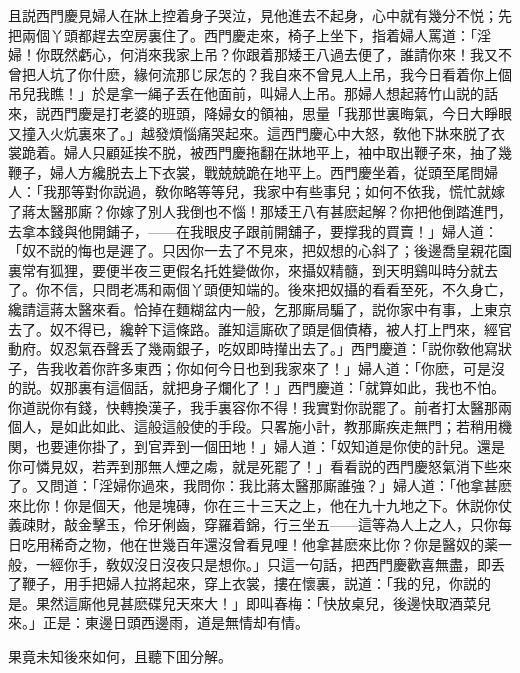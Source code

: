 且説西門慶見婦人在牀上控着身子哭泣，見他進去不起身，心中就有幾分不悦；先把兩個丫頭都趕去空房裏住了。西門慶走來，椅子上坐下，指着婦人罵道：「淫婦！你既然虧心，何消來我家上吊？你跟着那矮王八過去便了，誰請你來！我又不曾把人坑了你什麽，緣何流那じ尿怎的？我自來不曾見人上吊，我今日看着你上個吊兒我瞧！」於是拿一䋲子丢在他面前，叫婦人上吊。那婦人想起蔣竹山説的話來，説西門慶是打老婆的班頭，降婦女的領袖，思量「我那世裏晦氣，今日大睜眼又撞入火炕裏來了。」越發煩惱痛哭起來。這西門慶心中大怒，敎他下牀來脱了衣裳跪着。婦人只顧延挨不脱，被西門慶拖翻在牀地平上，袖中取出鞭子來，抽了幾鞭子，婦人方纔脱去上下衣裳，戰兢兢跪在地平上。西門慶坐着，従頭至尾問婦人：「我那等對你説過，敎你略等等兒，我家中有些事兒；如何不依我，慌忙就嫁了蔣太醫那廝？你嫁了別人我倒也不惱！那矮王八有甚麽起解？你把他倒踏進門，去拿本錢與他開鋪子，——在我眼皮子跟前開舖子，要撑我的買賣！」婦人道：「奴不説的悔也是遲了。只因你一去了不見來，把奴想的心斜了；後邊喬皇親花園裏常有狐狸，要便半夜三更假名托姓變做你，來攝奴精髓，到天明鷄叫時分就去了。你不信，只問老馮和兩個丫頭便知端的。後來把奴攝的看看至死，不久身亡，纔請這蔣太醫來看。恰掉在麵糊盆内一般，乞那廝局騙了，説你家中有事，上東京去了。奴不得已，纔幹下這條路。誰知這廝砍了頭是個債樁，被人打上門來，經官動府。奴忍氣吞聲丢了幾兩銀子，吃奴即時攆出去了。」西門慶道：「説你敎他寫狀子，告我收着你許多東西；你如何今日也到我家來了！」婦人道：「你麽，可是沒的説。奴那裏有這個話，就把身子爛化了！」西門慶道：「就算如此，我也不怕。你道説你有錢，快轉換漢子，我手裏容你不得！我實對你説罷了。前者打太醫那兩個人，是如此如此、這般這般使的手段。只畧施小計，教那廝疾走無門；若稍用機関，也要連你掛了，到官弄到一個田地！」婦人道：「奴知道是你使的計兒。還是你可憐見奴，若弄到那無人煙之䖏，就是死罷了！」看看説的西門慶怒氣消下些來了。又問道：「淫婦你過來，我問你：我比蔣太醫那廝誰強？」婦人道：「他拿甚麽來比你！你是個天，他是塊磚，你在三十三天之上，他在九十九地之下。休説你仗義疎財，敲金擊玉，伶牙俐齒，穿羅着錦，行三坐五——這等為人上之人，只你每日吃用稀奇之物，他在世幾百年還沒曾看見哩！他拿甚麽來比你？你是醫奴的薬一般，一經你手，敎奴沒日沒夜只是想你。」只這一句話，把西門慶歡喜無盡，即丢了鞭子，用手把婦人拉將起來，穿上衣裳，摟在懷裏，説道：「我的兒，你説的是。果然這廝他見甚麽碟兒天來大！」即叫春梅：「快放桌兒，後邊快取酒菜兒來。」正是：東邊日頭西邊雨，道是無情却有情。

果竟未知後來如何，且聽下囬分解。


